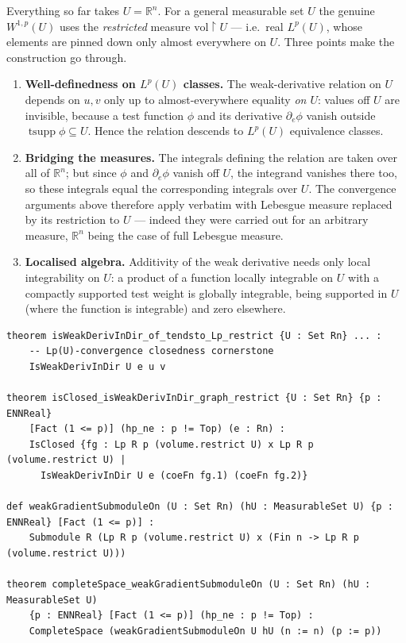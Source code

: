 ﻿\documentclass[12pt, a4paper]{article}
\renewcommand{\_}{\origunderscore\allowbreak}
\theoremstyle{definition}
\theoremstyle{plain}
\begin{document}
Everything so far takes $U=\mathbb{R}^n$. For a general measurable set $U$ the genuine
$W^{1,p}(U)$ uses the \emph{restricted} measure $\mathrm{vol}\restriction U$ --- i.e.\ real
$L^p(U)$, whose elements are pinned down only almost everywhere on $U$. Three points make the
construction go through.

\begin{enumerate}
  \item \textbf{Well-definedness on $L^p(U)$ classes.} The weak-derivative relation on $U$
    depends on $u,v$ only up to almost-everywhere equality \emph{on $U$}: values off $U$ are
    invisible, because a test function $\phi$ and its derivative $\partial_e\phi$ vanish
    outside $\operatorname{tsupp}\phi\subseteq U$. Hence the relation descends to $L^p(U)$
    equivalence classes.
  \item \textbf{Bridging the measures.} The integrals defining the relation are taken over all
    of $\mathbb{R}^n$; but since $\phi$ and $\partial_e\phi$ vanish off $U$, the integrand
    vanishes there too, so these integrals equal the corresponding integrals over $U$. The
    convergence arguments above therefore apply verbatim with Lebesgue measure replaced by its
    restriction to $U$ --- indeed they were carried out for an arbitrary measure, $\mathbb{R}^n$
    being the case of full Lebesgue measure.
  \item \textbf{Localised algebra.} Additivity of the weak derivative needs only local
    integrability on $U$: a product of a function locally integrable on $U$ with a compactly
    supported test weight is globally integrable, being supported in $U$ (where the function is
    integrable) and zero elsewhere.
\end{enumerate}

\begin{lstlisting}[caption={W^{1,p}(U) over the restricted measure is a Banach space (proved)}]
theorem isWeakDerivInDir_of_tendsto_Lp_restrict {U : Set Rn} ... :
    -- Lp(U)-convergence closedness cornerstone
    IsWeakDerivInDir U e u v

theorem isClosed_isWeakDerivInDir_graph_restrict {U : Set Rn} {p : ENNReal}
    [Fact (1 <= p)] (hp_ne : p != Top) (e : Rn) :
    IsClosed {fg : Lp R p (volume.restrict U) x Lp R p (volume.restrict U) |
      IsWeakDerivInDir U e (coeFn fg.1) (coeFn fg.2)}

def weakGradientSubmoduleOn (U : Set Rn) (hU : MeasurableSet U) {p : ENNReal} [Fact (1 <= p)] :
    Submodule R (Lp R p (volume.restrict U) x (Fin n -> Lp R p (volume.restrict U)))

theorem completeSpace_weakGradientSubmoduleOn (U : Set Rn) (hU : MeasurableSet U)
    {p : ENNReal} [Fact (1 <= p)] (hp_ne : p != Top) :
    CompleteSpace (weakGradientSubmoduleOn U hU (n := n) (p := p))
\end{lstlisting}
\end{document}
